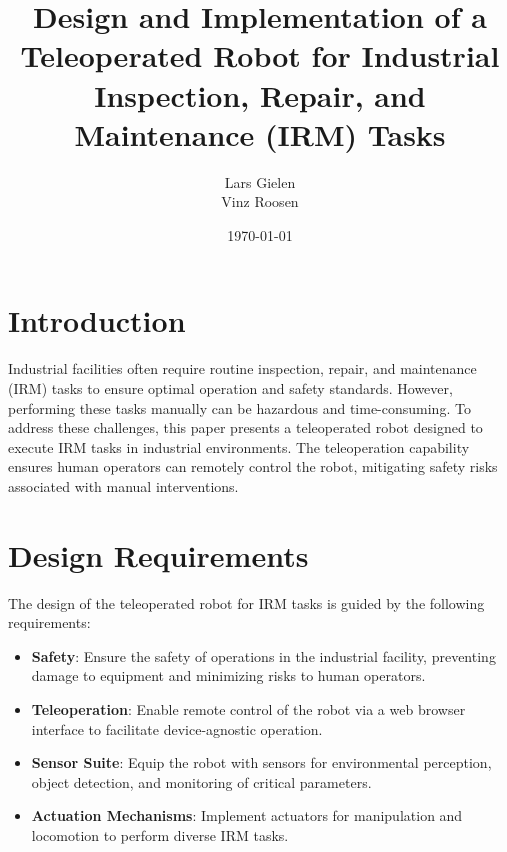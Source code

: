 \documentclass{article}
\title{Design and Implementation of a Teleoperated Robot for Industrial Inspection, Repair, and Maintenance (IRM) Tasks}
\author{Lars Gielen \\ Vinz Roosen}
\date{\today}
\begin{document}
\maketitle

\section{Introduction}
Industrial facilities often require routine inspection, repair, and maintenance (IRM) tasks to ensure optimal operation and safety standards. However, performing these tasks manually can be hazardous and time-consuming. To address these challenges, this paper presents a teleoperated robot designed to execute IRM tasks in industrial environments. The teleoperation capability ensures human operators can remotely control the robot, mitigating safety risks associated with manual interventions.

\section{Design Requirements}
The design of the teleoperated robot for IRM tasks is guided by the following requirements:
\begin{itemize}
    \item \textbf{Safety}: Ensure the safety of operations in the industrial facility, preventing damage to equipment and minimizing risks to human operators.
    \item \textbf{Teleoperation}: Enable remote control of the robot via a web browser interface to facilitate device-agnostic operation.
    \item \textbf{Sensor Suite}: Equip the robot with sensors for environmental perception, object detection, and monitoring of critical parameters.
    \item \textbf{Actuation Mechanisms}: Implement actuators for manipulation and locomotion to perform diverse IRM tasks.
\end{itemize}
\newpage
\end{document}
